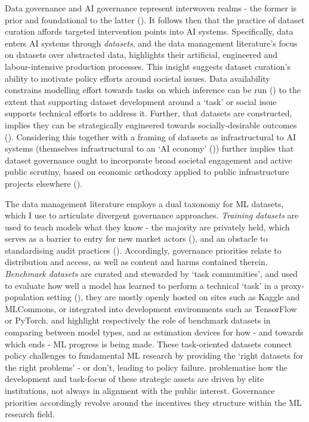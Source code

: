 Data governance and AI governance represent interwoven realms - the former is prior and foundational to the latter (\cite{InterwovenRealmsData}). It follows then that the practice of dataset curation affords targeted intervention points into AI systems. Specifically, data enters AI systems through \textit{datasets}, and the data management literature’s focus on datasets over abstracted data, highlights their artificial, engineered and labour-intensive production processes. This insight suggests dataset curation's ability to motivate policy efforts around societal issues. Data availability constrains modelling effort towards tasks on which inference can be run (\cite{leavy2020DataPowerBias}) to the extent that supporting dataset development around a `task' or social issue supports technical efforts to address it. Further, that datasets are constructed, implies they can be strategically engineered towards socially-desirable outcomes (\cite{oala2023DMLRDatacentricMachine, verdegem2022DismantlingAICapitalism}). Considering this together with a framing of datasets as infrastructural to AI systems (themselves infrastructural to an `AI economy' (\cite{khan2022SubjectsStagesAI})) further implies that dataset governance ought to incorporate broad societal engagement and active public scrutiny, based on economic orthodoxy applied to public infrastructure projects elsewhere (\cite{singh2019DataDigitalIntelligence}). 

The data management literature employs a dual taxonomy for ML datasets, which I use to articulate divergent governance approaches. \textit{Training datasets} are used to teach models what they know - the majority are privately held, which serves as a barrier to entry for new market actors (\cite{spiekermann2021BigDataJustice, birkinbine2018CommonsPraxisCritical}), and an obstacle to standardising audit practices (\cite{raji2020ClosingAIAccountability, shrestha2023BuildingOpensourceAI}). Accordingly, governance priorities relate to distribution and access, as well as content and  harms contained therein. \textit{Benchmark datasets} are curated and stewarded by `task communities', and used to evaluate how well a model has learned to perform a technical `task' in a proxy-population setting (\cite{paullada2021DataItsDis}), they are mostly openly hosted on sites such as Kaggle and MLCommons, or integrated into development environments such as TensorFlow or PyTorch. \textcite{koch2021ReducedReusedRecycled} and \textcite{oala2023DMLRDatacentricMachine} highlight respectively the role of benchmark datasets in comparing between model types, and as estimation devices for how - and towards which ends - ML progress is being made. These task-oriented datasets connect policy challenges to fundamental ML research by providing the `right datasets for the right problems' - or don’t, leading to policy failure. \textcite{paullada2021DataItsDis} problematise how the development and task-focus of these strategic assets are driven by elite institutions, not always in alignment with the public interest. Governance priorities accordingly revolve around the incentives they structure within the ML research field.

